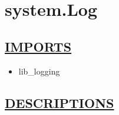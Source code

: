 \chapter*{system.Log}
\hypertarget{ecldoc:toc:system.Log}{}

\section*{\underline{IMPORTS}}
\begin{itemize}
\item lib\_logging
\end{itemize}

\section*{\underline{DESCRIPTIONS}}
